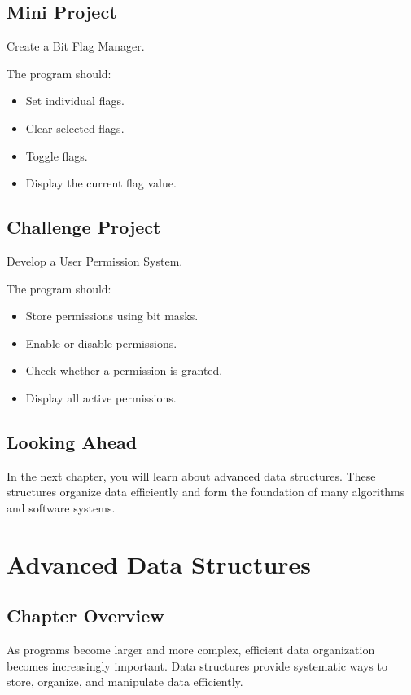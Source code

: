 \documentclass[12pt,openany]{book}
\begin{document}
\section{Mini Project}

Create a Bit Flag Manager.

The program should:

\begin{itemize}
    \item Set individual flags.
    \item Clear selected flags.
    \item Toggle flags.
    \item Display the current flag value.
\end{itemize}

\section{Challenge Project}

Develop a User Permission System.

The program should:

\begin{itemize}
    \item Store permissions using bit masks.
    \item Enable or disable permissions.
    \item Check whether a permission is granted.
    \item Display all active permissions.
\end{itemize}

\section{Looking Ahead}

In the next chapter, you will learn about advanced data structures. These structures organize data efficiently and form the foundation of many algorithms and software systems.
\chapter{Advanced Data Structures}

\section{Chapter Overview}

As programs become larger and more complex, efficient data organization becomes increasingly important. Data structures provide systematic ways to store, organize, and manipulate data efficiently.
\end{document}
